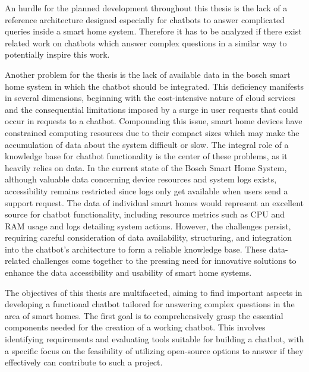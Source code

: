 An hurdle for the planned development throughout this thesis is the lack of a reference architecture designed especially for chatbots to answer complicated queries inside a smart home system.
Therefore it has to be analyzed if there exist related work on chatbots which answer complex questions in a similar way to potentially inspire this work.

Another problem for the thesis is the lack of available data in the bosch smart home system in which the chatbot should be integrated.
This deficiency manifests in several dimensions, beginning with the cost-intensive nature of cloud services and the consequential limitations imposed by a surge in user requests that could occur in requests to a chatbot. 
Compounding this issue, smart home devices have constrained computing resources due to their compact sizes which may make the accumulation of data about the system difficult or slow. 
The integral role of a knowledge base for chatbot functionality is the center of these problems, as it heavily relies on data. 
In the current state of the Bosch Smart Home System, although valuable data concerning device resources and system logs exists, accessibility remains restricted since logs only get available when users send a support request.
The data of individual smart homes would represent an excellent source for chatbot functionality, including resource metrics such as CPU and RAM usage and logs detailing system actions.
However, the challenges persist, requiring careful consideration of data availability, structuring, and integration into the chatbot's architecture to form a reliable knowledge base. 
These data-related challenges come together to the pressing need for innovative solutions to enhance the data accessibility and usability of smart home systems.



The objectives of this thesis are multifaceted, aiming to find important aspects in developing a functional chatbot tailored for answering complex questions in the area of smart homes. The first goal is to comprehensively grasp the essential components needed for the creation of a working chatbot. This involves identifying requirements and evaluating tools suitable for building a chatbot, with a specific focus on the feasibility of utilizing open-source options to answer if they effectively can contribute to such a project.


